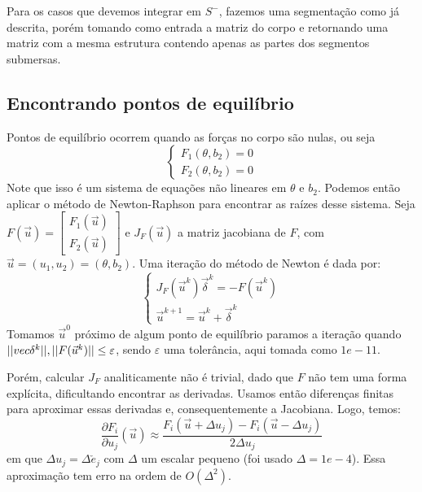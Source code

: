 \documentclass[
	12pt,				%
	oneside,			%
	a4paper,			%
	]{article}
\begin{document}
    Para os casos que devemos integrar em $S^-$, fazemos uma segmentação como já descrita, porém tomando como entrada a matriz do corpo e retornando uma matriz com a mesma estrutura contendo apenas as partes dos segmentos submersas.

    \subsection{Encontrando pontos de equilíbrio}
    Pontos de equilíbrio ocorrem quando as forças no corpo são nulas, ou seja
    \begin{equation}
        \begin{cases}
            F_1(\theta, b_2) = 0 \\
            F_2(\theta, b_2) = 0
        \end{cases}
        \label{eq:equilibrium}
    \end{equation}
    Note que isso é um sistema de equações não lineares em $\theta$ e $b_2$. Podemos então aplicar o método de Newton-Raphson para encontrar as raízes desse sistema. Seja $F(\vec{u}) = \begin{bmatrix}
        F_1(\vec{u}) \\
        F_2(\vec{u})
    \end{bmatrix}$ e $J_F(\vec{u})$ a matriz jacobiana de $F$, com $\vec{u} = (u_1, u_2) = (\theta, b_2)$. Uma iteração do método de Newton é dada por:
    \begin{equation}
        \begin{cases}
            J_F(\vec{u}^k) \vec{\delta}^k = -F(\vec{u}^k) \\
            \vec{u}^{k+1} = \vec{u}^k + \vec{\delta}^k
        \end{cases}
        \label{eq:Newton}
    \end{equation}
    Tomamos $\vec{u}^0$ próximo de algum ponto de equilíbrio paramos a iteração quando $\\||vec{\delta}^k||, ||F(\vec{u}^k)|| \le \varepsilon$, sendo $\varepsilon$ uma tolerância, aqui tomada como $1e-11$.

    Porém, calcular $J_F$ analiticamente não é trivial, dado que $F$ não tem uma forma explícita, dificultando encontrar as derivadas. Usamos então diferenças finitas para aproximar essas derivadas e, consequentemente a Jacobiana. Logo, temos:
    \begin{equation}
        \frac{\partial F_i}{\partial u_j}(\vec{u}) \approx \frac{F_i(\vec{u} + \Delta u_j) - F_i(\vec{u} - \Delta u_j)}{2 \Delta u_j}
        \label{eq:fin_dif}
    \end{equation}
    em que $\Delta u_j = \Delta\check{e}_j$ com $\Delta$ um escalar pequeno (foi usado $\Delta = 1e-4$). Essa aproximação tem erro na ordem de $O(\Delta^2)$.
\end{document}
